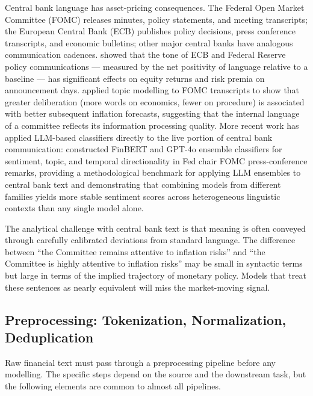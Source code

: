 Central bank language has asset-pricing consequences. The Federal Open Market Committee (FOMC) releases minutes, policy statements, and meeting transcripts; the European Central Bank (ECB) publishes policy decisions, press conference transcripts, and economic bulletins; other major central banks have analogous communication cadences. \citet{schmeling2019does} showed that the tone of ECB and Federal Reserve policy communications --- measured by the net positivity of language relative to a baseline --- has significant effects on equity returns and risk premia on announcement days. \citet{hansen2018transparency} applied topic modelling to FOMC transcripts to show that greater deliberation (more words on economics, fewer on procedure) is associated with better subsequent inflation forecasts, suggesting that the internal language of a committee reflects its information processing quality. More recent work has applied LLM-based classifiers directly to the live portion of central bank communication: \citet{XuBabaian2025} constructed FinBERT and GPT-4o ensemble classifiers for sentiment, topic, and temporal directionality in Fed chair FOMC press-conference remarks, providing a methodological benchmark for applying LLM ensembles to central bank text and demonstrating that combining models from different families yields more stable sentiment scores across heterogeneous linguistic contexts than any single model alone.

The analytical challenge with central bank text is that meaning is often conveyed through carefully calibrated deviations from standard language. The difference between ``the Committee remains attentive to inflation risks'' and ``the Committee is highly attentive to inflation risks'' may be small in syntactic terms but large in terms of the implied trajectory of monetary policy. Models that treat these sentences as nearly equivalent will miss the market-moving signal.

\subsection{Preprocessing: Tokenization, Normalization, Deduplication}
\label{sec:ch09-text-preprocessing}

Raw financial text must pass through a preprocessing pipeline before any modelling. The specific steps depend on the source and the downstream task, but the following elements are common to almost all pipelines.

